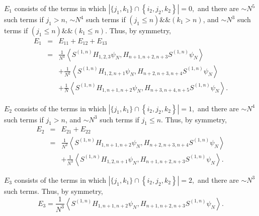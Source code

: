 \documentclass[12pt,letterpaper,leqno]{amsart}
\theoremstyle{plain}
\numberwithin{equation}{section}
\numberwithin{theorem}{section}
\numberwithin{proposition}{section}
\numberwithin{lemma}{section}
\numberwithin{corollary}{section}
\begin{document}
$E_{1}$ consists of the terms in which $\left\vert \{j_{1},k_{1}\}\cap
\left\{ i_{2},j_{2},k_{2}\right\} \right\vert =0,$ and there are $\sim N^{5}$
such terms if $j_{1}>n$, $\sim N^{4}$ such terms if $\left( j_{1}\leqslant
n\right) \&\&(k_{1}>n)$, and $\sim N^{3}$ such terms if $\left(
j_{1}\leqslant n\right) \&\&(k_{1}\leqslant n)$. Thus, by symmetry,%
\begin{eqnarray*}
E_{1} &=&E_{11}+E_{12}+E_{13} \\
&=&\frac{1}{N^{3}}\left\langle S^{(1,n)}H_{1,2,3}\psi
_{N},H_{n+1,n+2,n+3}S^{(1,n)}\psi _{N}\right\rangle \\
&&+\frac{1}{N^{2}}\left\langle S^{(1,n)}H_{1,2,n+1}\psi
_{N},H_{n+2,n+3,n+4}S^{(1,n)}\psi _{N}\right\rangle \\
&&+\frac{1}{N}\left\langle S^{(1,n)}H_{1,n+1,n+2}\psi
_{N},H_{n+3,n+4,n+5}S^{(1,n)}\psi _{N}\right\rangle .
\end{eqnarray*}

$E_{2}$ consists of the terms in which $\left\vert \{j_{1},k_{1}\}\cap
\left\{ i_{2},j_{2},k_{2}\right\} \right\vert =1,$ and there are $\sim N^{4}$
such terms if $j_{1}>n$, and $\sim N^{3}$ such terms if $j_{1}\leqslant n$.
Thus, by symmetry,%
\begin{eqnarray*}
E_{2} &=&E_{21}+E_{22} \\
&=&\frac{1}{N^{2}}\left\langle S^{(1,n)}H_{1,n+1,n+2}\psi
_{N},H_{n+2,n+3,n+4}S^{(1,n)}\psi _{N}\right\rangle \\
&&+\frac{1}{N^{3}}\left\langle S^{(1,n)}H_{1,2,n+1}\psi
_{N},H_{n+1,n+2,n+3}S^{(1,n)}\psi _{N}\right\rangle .
\end{eqnarray*}

$E_{3}$ consists of the terms in which $\left\vert \{j_{1},k_{1}\}\cap
\left\{ i_{2},j_{2},k_{2}\right\} \right\vert =2,$ and there are $\sim N^{3}$
such terms. Thus, by symmetry,%
\begin{equation*}
E_{3}=\frac{1}{N^{3}}\left\langle S^{(1,n)}H_{1,n+1,n+2}\psi
_{N},H_{n+1,n+2,n+3}S^{(1,n)}\psi _{N}\right\rangle .
\end{equation*}
\end{document}
